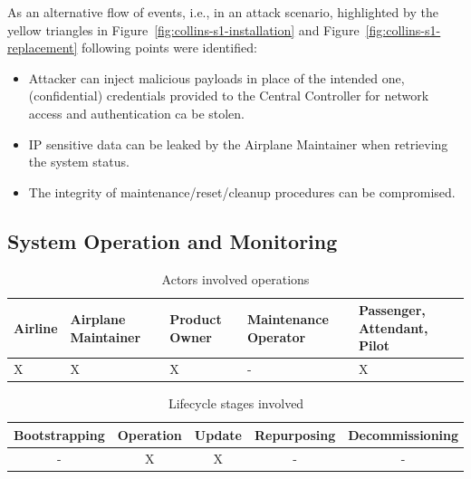 As an alternative flow of events, i.e., in an attack scenario, highlighted by the yellow triangles in
Figure~\ref{fig:collins-s1-installation} and Figure~\ref{fig:collins-s1-replacement} following points were identified:

\begin{itemize}
	\item Attacker can inject malicious payloads in place of the intended one, (confidential) credentials provided
	      to the Central Controller for network access and authentication ca be stolen.
	\item IP sensitive data can be leaked by the Airplane Maintainer when retrieving the system status.
	\item The integrity of maintenance/reset/cleanup procedures can be compromised.
\end{itemize}


\subsection{System Operation and Monitoring} %
\label{sub:System Operation and Monitoring}

\begin{table}
	\caption{Actors involved operations}
	\label{tab:Actors involved}
	\begin{center}
		\begin{tabular}{ |p{2.5cm}|p{2.5cm}|p{2.5cm}|p{2.5cm}|p{2.5cm}| }
			\hline
			Airline & Airplane Maintainer & Product Owner & Maintenance Operator & Passenger, Attendant, Pilot \\
			\hline
			X       & X                   & X             & -                    & X                           \\
			\hline
		\end{tabular}
	\end{center}
\end{table}

\begin{table}
	\caption{Lifecycle stages involved}
	\label{tab:Lifecycle stages involved operations}
	\begin{center}
		\begin{tabular}{ |c|c|c|c|c| }
			\hline
			Bootstrapping & Operation & Update & Repurposing & Decommissioning \\
			\hline
			-             & X         & X      & -           & -               \\
			\hline
		\end{tabular}
	\end{center}
\end{table}

